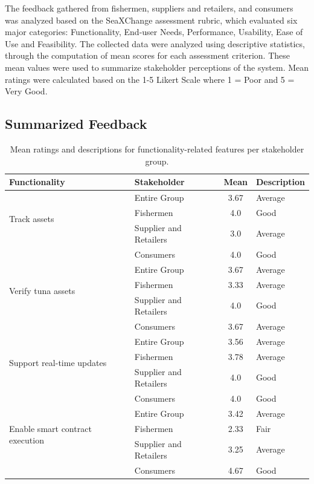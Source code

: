 	The feedback gathered from fishermen, suppliers and retailers, and consumers was analyzed based on the SeaXChange assessment rubric, which evaluated six major categories: Functionality, End-user Needs, Performance, Usability, Ease of Use and Feasibility. The collected data were analyzed using descriptive statistics, through the computation of mean scores for each assessment criterion. These mean values were used to summarize stakeholder perceptions of the system. Mean ratings were calculated based on the 1-5 Likert Scale where 1 = Poor and 5 = Very Good.
	
\subsection{Summarized Feedback}
	\begin{table}[h]
		\centering
		\begin{tabular}{|l|l|c|l|}
			\hline
			\textbf{Functionality} & \textbf{Stakeholder} & \textbf{Mean} & \textbf{Description} \\ \hline
			\multirow{3}{*}{Track assets} 
			& Entire Group & 3.67 & Average \\ \cline{2-4}
			& Fishermen & 4.0 & Good \\ \cline{2-4}
			& Supplier and Retailers & 3.0 & Average \\ \cline{2-4}
			& Consumers & 4.0 & Good \\ \hline
			
			\multirow{3}{*}{Verify tuna assets} 
			& Entire Group & 3.67 & Average \\ \cline{2-4}
			& Fishermen & 3.33 & Average \\ \cline{2-4}
			& Supplier and Retailers & 4.0 & Good \\ \cline{2-4}
			& Consumers & 3.67 & Average \\ \hline
			
			\multirow{3}{*}{Support real-time updates} 
			& Entire Group & 3.56 & Average \\ \cline{2-4}
			& Fishermen & 3.78 & Average \\ \cline{2-4}
			& Supplier and Retailers & 4.0 & Good \\ \cline{2-4}
			& Consumers & 4.0 & Good \\ \hline
			
			\multirow{3}{*}{Enable smart contract execution} 
			& Entire Group & 3.42 & Average \\ \cline{2-4}
			& Fishermen & 2.33 & Fair \\ \cline{2-4}
			& Supplier and Retailers & 3.25 & Average \\ \cline{2-4}
			& Consumers & 4.67 & Good \\ \hline
			
		\end{tabular}
		\caption{Mean ratings and descriptions for functionality-related features per stakeholder group.}
		\label{tab:functionality}
	\end{table}
	
